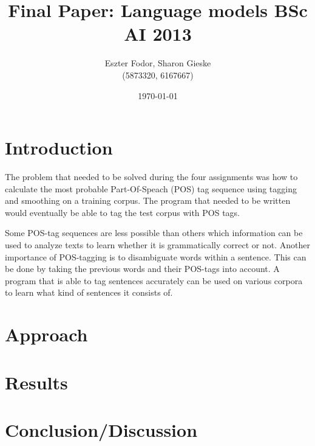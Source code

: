 \documentclass[11pt, a4paper]{article}
\title{Final Paper: Language models BSc AI 2013}
\author{Eszter Fodor, Sharon Gieske \\ (5873320, 6167667)}
\date{\today}
\begin{document}
\maketitle{}


\section*{Introduction}
The problem that needed to be solved during the four assignments was how to calculate the most
probable Part-Of-Speach (POS) tag sequence using tagging and smoothing on a training corpus. The
program that needed to be written would eventually be able to tag the test corpus with POS tags.

Some POS-tag sequences are less possible than others which information can be used to analyze 
texts to learn whether it is grammatically correct or not.
Another importance of POS-tagging is to disambiguate words within a sentence. This can be done by
taking the previous words and their POS-tags into account. A program that is able to tag sentences
accurately can be used on various corpora to learn what kind of sentences it consists of. 

\section*{Approach}



\section*{Results}


\section*{Conclusion/Discussion}
\end{document}
